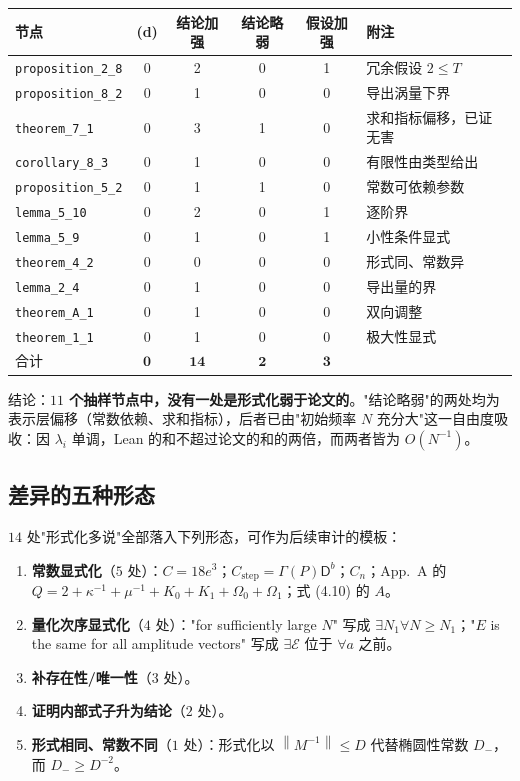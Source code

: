 \documentclass[11pt,a4paper]{ctexart}
\theoremstyle{definition}
\newcommand{\norm}[1]{\left\lVert #1\right\rVert}
\begin{document}
\begin{center}
\begin{tabular}{@{}lccccl@{}}
\toprule
节点 & (d) & 结论加强 & 结论略弱 & 假设加强 & 附注 \\
\midrule
\texttt{proposition\_2\_8}   & 0 & 2 & 0 & 1 & 冗余假设 $2\le T$ \\
\texttt{proposition\_8\_2}   & 0 & 1 & 0 & 0 & 导出涡量下界 \\
\texttt{theorem\_7\_1}       & 0 & 3 & 1 & 0 & 求和指标偏移，已证无害 \\
\texttt{corollary\_8\_3}     & 0 & 1 & 0 & 0 & 有限性由类型给出 \\
\texttt{proposition\_5\_2}   & 0 & 1 & 1 & 0 & 常数可依赖参数 \\
\texttt{lemma\_5\_10}        & 0 & 2 & 0 & 1 & 逐阶界 \\
\texttt{lemma\_5\_9}         & 0 & 1 & 0 & 1 & 小性条件显式 \\
\texttt{theorem\_4\_2}       & 0 & 0 & 0 & 0 & 形式同、常数异 \\
\texttt{lemma\_2\_4}         & 0 & 1 & 0 & 0 & 导出量的界 \\
\texttt{theorem\_A\_1}       & 0 & 1 & 0 & 0 & 双向调整 \\
\texttt{theorem\_1\_1}       & 0 & 1 & 0 & 0 & 极大性显式 \\
\midrule
合计 & $\mathbf{0}$ & $\mathbf{14}$ & $\mathbf{2}$ & $\mathbf{3}$ & \\
\bottomrule
\end{tabular}
\end{center}

\noindent 结论：\textbf{$11$ 个抽样节点中，没有一处是形式化弱于论文的}。"结论略弱"的两处均为表示层偏移（常数依赖、求和指标），后者已由"初始频率 $N$ 充分大"这一自由度吸收：因 $\lambda_i$ 单调，Lean 的和不超过论文的和的两倍，而两者皆为 $O(N^{-1})$。

\subsection{差异的五种形态}

$14$ 处"形式化多说"全部落入下列形态，可作为后续审计的模板：

\begin{enumerate}[label=\textbf{(\Alph*)}]
\item \textbf{常数显式化}（$5$ 处）：$C=18e^3$；$C_{\text{step}}=\Gamma(P)\mathsf D^b$；$C_n$；App.~A 的 $Q=2+\kappa^{-1}+\mu^{-1}+K_0+K_1+\Omega_0+\Omega_1$；式 (4.10) 的 $A$。
\item \textbf{量化次序显式化}（$4$ 处）："for sufficiently large $N$" 写成 $\exists N_1\forall N\ge N_1$；"$E$ is the same for all amplitude vectors" 写成 $\exists\mathcal E$ 位于 $\forall a$ 之前。
\item \textbf{补存在性/唯一性}（$3$ 处）。
\item \textbf{证明内部式子升为结论}（$2$ 处）。
\item \textbf{形式相同、常数不同}（$1$ 处）：形式化以 $\norm{M^{-1}}\le D$ 代替椭圆性常数 $D_-$，而 $D_-\ge D^{-2}$。
\end{enumerate}
\end{document}

